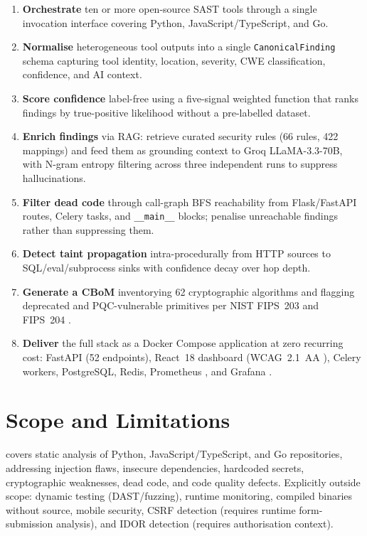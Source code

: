 \begin{enumerate}
  \item \textbf{Orchestrate} ten or more open-source SAST tools through a single invocation interface covering Python, JavaScript/TypeScript, and Go.
  \item \textbf{Normalise} heterogeneous tool outputs into a single \texttt{CanonicalFinding} schema capturing tool identity, location, severity, CWE classification, confidence, and AI context.
  \item \textbf{Score confidence} label-free using a five-signal weighted function that ranks findings by true-positive likelihood without a pre-labelled dataset.
  \item \textbf{Enrich findings} via RAG: retrieve curated security rules (66 rules, 422 mappings) and feed them as grounding context to Groq LLaMA-3.3-70B, with N-gram entropy filtering across three independent runs to suppress hallucinations.
  \item \textbf{Filter dead code} through call-graph BFS reachability from Flask/FastAPI routes, Celery tasks, and \texttt{\_\_main\_\_} blocks; penalise unreachable findings rather than suppressing them.
  \item \textbf{Detect taint propagation} intra-procedurally from HTTP sources to SQL/eval/subprocess sinks with confidence decay over hop depth.
  \item \textbf{Generate a CBoM} inventorying 62 cryptographic algorithms and flagging deprecated and PQC-vulnerable primitives per NIST FIPS~203 \cite{nist_fips_203} and FIPS~204 \cite{nist_fips_204}.
  \item \textbf{Deliver} the full stack as a Docker Compose application at zero recurring cost: FastAPI \cite{fastapi_framework} (52 endpoints), React~18 dashboard (WCAG~2.1~AA \cite{wcag21}), Celery \cite{celery_project} workers, PostgreSQL, Redis, Prometheus \cite{prometheus_docs}, and Grafana \cite{grafana_docs}.
\end{enumerate}

\section{Scope and Limitations}
\label{sec:scope}

\ACRQA{} covers static analysis of Python, JavaScript/TypeScript, and Go repositories, addressing injection flaws, insecure dependencies, hardcoded secrets, cryptographic weaknesses, dead code, and code quality defects. Explicitly outside scope: dynamic testing (DAST/fuzzing), runtime monitoring, compiled binaries without source, mobile security, CSRF detection (requires runtime form-submission analysis), and IDOR detection (requires authorisation context).

